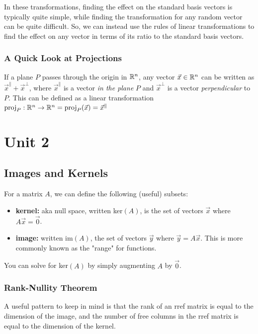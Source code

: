 \documentclass[12pt]{article}
\begin{document}
In these transformations, finding the effect on the standard basis vectors is typically quite simple, while finding the transformation for any random vector can be quite difficult. So, we can instead use the rules of linear transformations to find the effect on any vector in terms of its ratio to the standard basis vectors.

\subsubsection{A Quick Look at Projections}

If a plane $P$ passes through the origin in $\mathbb{R}^n$, any vector $\Vec{x} \in \mathbb{R}^n$ can be written as $\Vec{x}^{\parallel} + \Vec{x}^{\perp}$, where $\Vec{x}^{\parallel}$ is a vector \textit{in the plane} $P$ and $\Vec{x}^{\perp}$ is a vector \textit{perpendicular} to $P$. This can be defined as a linear transformation $\text{proj}_P:\mathbb{R}^n \to \mathbb{R}^n = \text{proj}_P(\Vec{x}) = \Vec{x}^{\parallel}$

\section{Unit 2}
\subsection{Images and Kernels}

For a matrix $A$, we can define the following (useful) subsets:

\begin{itemize}
    \item \textbf{kernel:} aka null space, written ker$(A)$, is the set of vectors $\Vec{x}$ where $A\Vec{x} = \Vec{0}$.
    
    \item \textbf{image:} written im$(A)$, the set of vectors $\Vec{y}$ where $\Vec{y} = A\Vec{x}$. This is more commonly known as the "range" for functions.
\end{itemize}

You can solve for ker$(A)$ by simply augmenting $A$ by $\Vec{0}$.

\subsubsection{Rank-Nullity Theorem}

A useful pattern to keep in mind is that the rank of an rref matrix is equal to the dimension of the image, and the number of free columns in the rref matrix is equal to the dimension of the kernel.
\end{document}
